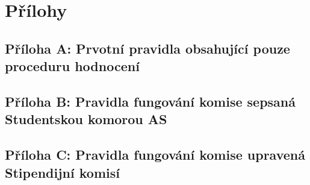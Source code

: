 
\chapter{Přílohy}

\section{Příloha A: Prvotní pravidla obsahující pouze proceduru hodnocení}


\newpage
\section{Příloha B: Pravidla fungování komise sepsaná Studentskou komorou AS}


\newpage
\section{Příloha C: Pravidla fungování komise upravená Stipendijní komisí}
